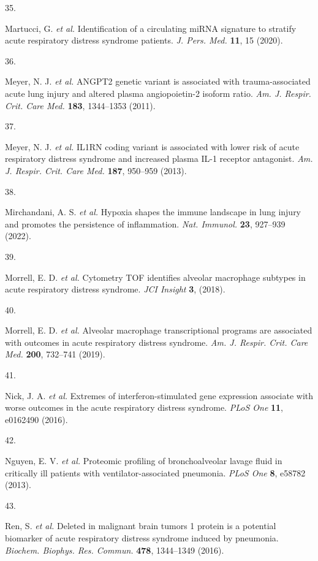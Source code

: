 \documentclass[
  11,
  a4paper,
]{article}
\newlength{\cslhangindent}
\newlength{\csllabelwidth}
\newenvironment{CSLReferences}[2] %
 {\begin{list}{}{%
  \setlength{\itemindent}{0pt}
  \setlength{\leftmargin}{0pt}
  \setlength{\parsep}{0pt}
  \ifodd #1
   \setlength{\leftmargin}{\cslhangindent}
   \setlength{\itemindent}{-1\cslhangindent}
  \fi
  \setlength{\itemsep}{#2\baselineskip}}}
 {\end{list}}
\newcommand{\CSLLeftMargin}[1]{\parbox[t]{\csllabelwidth}{\strut#1\strut}}
\newcommand{\CSLRightInline}[1]{\parbox[t]{\linewidth - \csllabelwidth}{\strut#1\strut}}
\begin{document}
\begin{CSLReferences}{0}{0}
\CSLLeftMargin{35. }%
\CSLRightInline{Martucci, G. \emph{et al.} Identification of a
circulating {miRNA} signature to stratify acute respiratory distress
syndrome patients. \emph{J. Pers. Med.} \textbf{11}, 15 (2020).}

\CSLLeftMargin{36. }%
\CSLRightInline{Meyer, N. J. \emph{et al.} {ANGPT2} genetic variant is
associated with trauma-associated acute lung injury and altered plasma
angiopoietin-2 isoform ratio. \emph{Am. J. Respir. Crit. Care Med.}
\textbf{183}, 1344--1353 (2011).}

\CSLLeftMargin{37. }%
\CSLRightInline{Meyer, N. J. \emph{et al.} {IL1RN} coding variant is
associated with lower risk of acute respiratory distress syndrome and
increased plasma {IL-1} receptor antagonist. \emph{Am. J. Respir. Crit.
Care Med.} \textbf{187}, 950--959 (2013).}

\CSLLeftMargin{38. }%
\CSLRightInline{Mirchandani, A. S. \emph{et al.} Hypoxia shapes the
immune landscape in lung injury and promotes the persistence of
inflammation. \emph{Nat. Immunol.} \textbf{23}, 927--939 (2022).}

\CSLLeftMargin{39. }%
\CSLRightInline{Morrell, E. D. \emph{et al.} Cytometry {TOF} identifies
alveolar macrophage subtypes in acute respiratory distress syndrome.
\emph{JCI Insight} \textbf{3}, (2018).}

\CSLLeftMargin{40. }%
\CSLRightInline{Morrell, E. D. \emph{et al.} Alveolar macrophage
transcriptional programs are associated with outcomes in acute
respiratory distress syndrome. \emph{Am. J. Respir. Crit. Care Med.}
\textbf{200}, 732--741 (2019).}

\CSLLeftMargin{41. }%
\CSLRightInline{Nick, J. A. \emph{et al.} Extremes of
interferon-stimulated gene expression associate with worse outcomes in
the acute respiratory distress syndrome. \emph{PLoS One} \textbf{11},
e0162490 (2016).}

\CSLLeftMargin{42. }%
\CSLRightInline{Nguyen, E. V. \emph{et al.} Proteomic profiling of
bronchoalveolar lavage fluid in critically ill patients with
ventilator-associated pneumonia. \emph{PLoS One} \textbf{8}, e58782
(2013).}

\CSLLeftMargin{43. }%
\CSLRightInline{Ren, S. \emph{et al.} Deleted in malignant brain tumors
1 protein is a potential biomarker of acute respiratory distress
syndrome induced by pneumonia. \emph{Biochem. Biophys. Res. Commun.}
\textbf{478}, 1344--1349 (2016).}


\end{CSLReferences}
\end{document}
